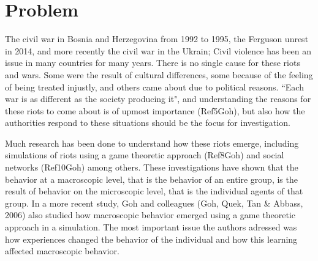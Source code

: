 \chapter{Problem}
The civil war in Bosnia and Herzegovina from 1992 to 1995, the Ferguson unrest in 2014, and more recently the civil war in the Ukrain; Civil violence has been an issue in many countries for many years. There is no single cause for these riots and wars. Some were the result of cultural differences, some because of the feeling of being treated injustly, and others came about due to political reasons. ``Each war is as different as the society producing it", and understanding the reasons for these riots to come about is of upmost importance (Ref5Goh), but also how the authorities respond to these situations should be the focus for investigation. 

Much research has been done to understand how these riots emerge, including simulations of riots using a game theoretic approach (Ref8Goh) and social networks (Ref10Goh) among others. These investigations have shown that the behavior at a macroscopic level, that is the behavior of an entire group, is the result of behavior on the microscopic level, that is the individual agents of that group. In a more recent study, Goh and colleagues (Goh, Quek, Tan \& Abbass, 2006) also studied how macroscopic behavior emerged using a game theoretic approach in a simulation. The most important issue the authors adressed was how experiences changed the behavior of the individual and how this learning affected macroscopic behavior. 

